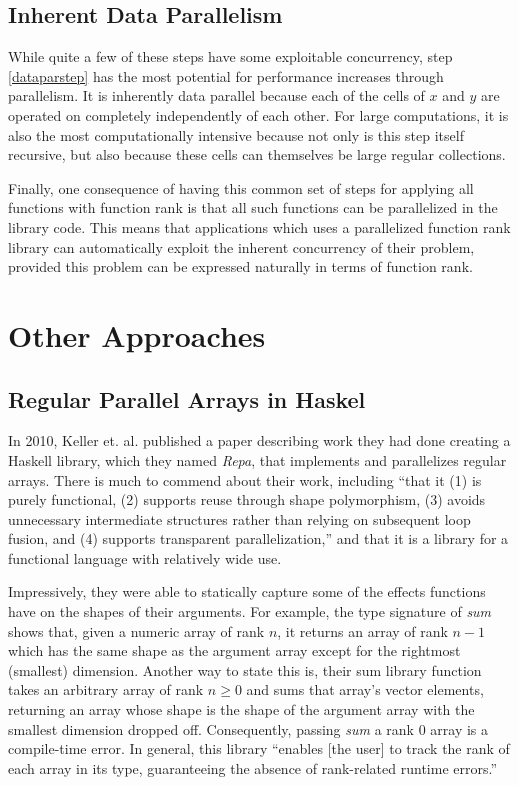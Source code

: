\subsection{Inherent Data Parallelism}
While quite a few of these steps have some exploitable concurrency, 
step \ref{dataparstep} has the most potential for performance increases through parallelism.
It is inherently data parallel because each of the cells of $x$ and $y$ are operated on completely independently of each other.
For large computations, it is also the most computationally intensive 
because not only is this step itself recursive, but
also because these cells can themselves be large regular collections.

Finally, one consequence of having this common set of steps for applying all functions with function rank is
that all such functions can be parallelized in the library code.
This means that applications which uses a parallelized function rank library 
can automatically exploit the inherent concurrency of their problem, 
provided this problem can be expressed naturally in terms of function rank.

\section{Other Approaches}
\subsection{Regular Parallel Arrays in Haskel}
\label{repa}
In 2010, Keller et. al. published a paper\cite{dph} 
describing work they had done creating a Haskell library, which they named \textit{Repa}, that implements and parallelizes regular arrays.
There is much to commend about their work, including ``that it (1) is purely
functional, (2) supports reuse through shape polymorphism, (3)
avoids unnecessary intermediate structures rather than relying on
subsequent loop fusion, and (4) supports transparent parallelization,''
and that it is a library for a functional language with relatively wide use.

Impressively, they were able to statically capture some of the effects functions have on the shapes of their arguments.
For example, the type signature of \textit{sum} shows that, given a numeric array of rank $n$, 
it returns an array of rank $n-1$ which has the same shape as the argument array 
except for the rightmost (smallest) dimension.
Another way to state this is, their sum library function takes an arbitrary array of rank $n \ge 0$ 
and sums that array's vector elements, 
returning an array whose shape is the shape of the argument array with the smallest dimension dropped off.
Consequently, passing \textit{sum} a rank 0 array is a compile-time error.
In general, this library ``enables [the user] to track the rank of each array in its type,
guaranteeing the absence of rank-related runtime errors.''

